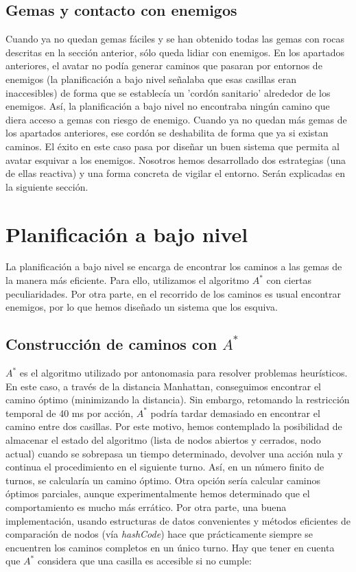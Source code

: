 \subsection{Gemas y contacto con enemigos}

Cuando ya no quedan gemas fáciles y se han obtenido todas las gemas con rocas descritas en la sección anterior, sólo queda lidiar con enemigos. En los apartados anteriores, el avatar no podía generar caminos que pasaran por entornos de enemigos (la planificación a bajo nivel señalaba que esas casillas eran inaccesibles) de forma que se establecía un 'cordón sanitario' alrededor de los enemigos. Así, la planificación a bajo nivel no encontraba ningún camino que diera acceso a gemas con riesgo de enemigo. Cuando ya no quedan más gemas de los apartados anteriores, ese cordón se deshabilita de forma que ya si existan caminos. El éxito en este caso pasa por diseñar un buen sistema que permita al avatar esquivar a los enemigos. Nosotros hemos desarrollado dos estrategias (una de ellas reactiva) y una forma concreta de vigilar el entorno. Serán explicadas en la siguiente sección.

\section{Planificación a bajo nivel}

La planificación a bajo nivel se encarga de encontrar los caminos a las gemas de la manera más eficiente. Para ello, utilizamos el algoritmo $A^*$ con ciertas peculiaridades. Por otra parte, en el recorrido de los caminos es usual encontrar enemigos, por lo que hemos diseñado un sistema que los esquiva.

\subsection{Construcción de caminos con $A^*$}

$A^*$ es el algoritmo utilizado por antonomasia para resolver problemas heurísticos. En este caso, a través de la distancia Manhattan, conseguimos encontrar el camino óptimo (minimizando la distancia). Sin embargo, retomando la restricción temporal de 40 ms por acción, $A^*$ podría tardar demasiado en encontrar el camino entre dos casillas. Por este motivo, hemos contemplado la posibilidad de almacenar el estado del algoritmo (lista de nodos abiertos y cerrados, nodo actual) cuando se sobrepasa un tiempo determinado, devolver una acción nula y continua el procedimiento en el siguiente turno. Así, en un número finito de turnos, se calcularía un camino óptimo. Otra opción sería calcular caminos óptimos parciales, aunque experimentalmente hemos determinado que el comportamiento es mucho más errático. Por otra parte, una buena implementación, usando estructuras de datos convenientes y métodos eficientes de comparación de nodos (vía \textit{hashCode}) hace que prácticamente siempre se encuentren los caminos completos en un único turno. Hay que tener en cuenta que $A^*$ considera que una casilla es accesible si no cumple:

